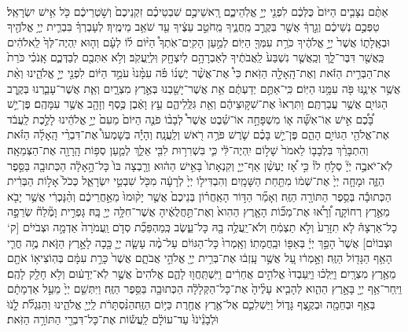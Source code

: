 \documentclass[twoside, openany, parskip=half, 11pt]{book}
\begin{document}
\begin{footnotesize}
\begin{multicols}{2}
\\
 אַתֶּ֨ם נִצָּבִ֤ים הַיּוֹם֙ כֻּלְּכֶ֔ם לִפְנֵ֖י יְיָ֣ אֱלֹֽהֵיכֶ֑ם רָֽאשֵׁיכֶ֣ם שִׁבְטֵיכֶ֗ם זִקְנֵיכֶם֙ וְשֹׁ֣טְרֵיכֶ֔ם כֹּ֖ל אִ֥ישׁ יִשְׂרָאֵֽל׃ טַפְּכֶ֣ם נְשֵׁיכֶ֔ם וְגֵ֣רְךָ֔ אֲשֶׁ֖ר בְּקֶרֶ֣ב מַֽחֲנֶ֑יךָ מֵֽחֹטֵ֣ב עֵצֶ֔יךָ עַ֖ד שֹׁאֵ֥ב מֵימֶֽיךָ׃ לְעָבְרְךָ֗ בִּבְרִ֛ית יְיָ֥ אֱלֹהֶ֖יךָ וּבְאָֽלָת֑וֹ אֲשֶׁר֙ יְיָ֣ אֱלֹהֶ֔יךָ כֹּרֵ֥ת עִמְּךָ֖ הַיּֽוֹם׃ 
 לְמַ֣עַן הָקִֽים־אֹֽתְךָ֩ הַיּ֨וֹם ל֜וֹ לְעָ֗ם וְה֤וּא יִֽהְיֶה־לְּךָ֙ לֵֽאלֹהִ֔ים כַּֽאֲשֶׁ֖ר דִּבֶּר־לָ֑ךְ וְכַֽאֲשֶׁ֤ר נִשְׁבַּע֙ לַֽאֲבֹתֶ֔יךָ לְאַבְרָהָ֥ם לְיִצְחָ֖ק וּֽלְיַֽעֲקֹֽב׃ וְלֹ֥א אִתְּכֶ֖ם לְבַדְּכֶ֑ם אָֽנֹכִ֗י כֹּרֵת֙ אֶת־הַבְּרִ֣ית הַזֹּ֔את וְאֶת־הָֽאָלָ֖ה הַזֹּֽאת׃ כִּי֩ אֶת־אֲשֶׁ֨ר יֶשְׁנ֜וֹ פֹּ֗ה עִמָּ֨נוּ֙ עֹמֵ֣ד הַיּ֔וֹם לִפְנֵ֖י יְיָ֣ אֱלֹהֵ֑ינוּ וְאֵ֨ת אֲשֶׁ֥ר אֵינֶ֛נּוּ פֹּ֖ה עִמָּ֥נוּ הַיּֽוֹם׃ 
 כִּֽי־אַתֶּ֣ם יְדַעְתֶּ֔ם אֵ֥ת אֲשֶׁר־יָשַׁ֖בְנוּ בְּאֶ֣רֶץ מִצְרָ֑יִם וְאֵ֧ת אֲשֶׁר־עָבַ֛רְנוּ בְּקֶ֥רֶב הַגּוֹיִ֖ם אֲשֶׁ֥ר עֲבַרְתֶּֽם׃ וַתִּרְאוּ֙ אֶת־שִׁקּ֣וּצֵיהֶ֔ם וְאֵ֖ת גִּלֻּֽלֵיהֶ֑ם עֵ֣ץ וָאֶ֔בֶן כֶּ֥סֶף וְזָהָ֖ב אֲשֶׁ֥ר עִמָּהֶֽם׃ פֶּן־יֵ֣שׁ בָּ֠כֶ֠ם אִ֣ישׁ אֽוֹ־אִשָּׁ֞ה א֧וֹ מִשְׁפָּחָ֣ה אוֹ־שֵׁ֗בֶט אֲשֶׁר֩ לְבָב֨וֹ פֹנֶ֤ה הַיּוֹם֙ מֵעִם֙ יְיָ֣ אֱלֹהֵ֔ינוּ לָלֶ֣כֶת לַֽעֲבֹ֔ד אֶת־אֱלֹהֵ֖י הַגּוֹיִ֣ם הָהֵ֑ם פֶּן־יֵ֣שׁ בָּכֶ֗ם שֹׁ֛רֶשׁ פֹּרֶ֥ה רֹ֖אשׁ וְלַֽעֲנָֽה׃ וְהָיָ֡ה בְּשָׁמְעוֹ֩ אֶת־דִּבְרֵ֨י הָֽאָלָ֜ה הַזֹּ֗את וְהִתְבָּרֵ֨ךְ בִּלְבָב֤וֹ לֵאמֹר֙ שָׁל֣וֹם יִֽהְיֶה־לִּ֔י כִּ֛י בִּשְׁרִר֥וּת לִבִּ֖י אֵלֵ֑ךְ לְמַ֛עַן סְפ֥וֹת הָֽרָוָ֖ה אֶת־הַצְּמֵאָֽה׃ לֹֽא־יֹאבֶ֣ה יְיָ֘ סְלֹ֣חַ לוֹ֒ כִּ֣י אָ֠ז יֶעְשַׁ֨ן אַף־יְיָ֤ וְקִנְאָתוֹ֙ בָּאִ֣ישׁ הַה֔וּא וְרָ֤בְצָה בּוֹ֙ כָּל־הָ֣אָלָ֔ה הַכְּתוּבָ֖ה בַּסֵּ֣פֶר הַזֶּ֑ה וּמָחָ֤ה יְיָ֙ אֶת־שְׁמ֔וֹ מִתַּ֖חַת הַשָּׁמָֽיִם׃ וְהִבְדִּיל֤וֹ יְיָ֙ לְרָעָ֔ה מִכֹּ֖ל שִׁבְטֵ֣י יִשְׂרָאֵ֑ל כְּכֹל֙ אָל֣וֹת הַבְּרִ֔ית הַכְּתוּבָ֕ה בְּסֵ֥פֶר הַתּוֹרָ֖ה הַזֶּֽה׃ וְאָמַ֞ר הַדּ֣וֹר הָאַֽחֲר֗וֹן בְּנֵיכֶם֙ אֲשֶׁ֤ר יָק֨וּמוּ֙ מֵאַ֣חֲרֵיכֶ֔ם וְהַ֨נָּכְרִ֔י אֲשֶׁ֥ר יָבֹ֖א מֵאֶ֣רֶץ רְחוֹקָ֑ה וְ֠רָא֠וּ אֶת־מַכּ֞וֹת הָאָ֤רֶץ הַהִוא֙ וְאֶת־תַּ֣חֲלֻאֶ֔יהָ אֲשֶׁר־חִלָּ֥ה יְיָ֖ בָּֽהּ׃ גָּפְרִ֣ית וָמֶ֘לַח֘ שְׂרֵפָ֣ה כָל־אַרְצָהּ֒ לֹ֤א תִזָּרַע֙ וְלֹ֣א תַצְמִ֔חַ וְלֹא־יַֽעֲלֶ֥ה בָ֖הּ כָּל־עֵ֑שֶׂב כְּֽמַהְפֵּכַ֞ת סְדֹ֤ם וַֽעֲמֹרָה֙ אַדְמָ֣ה וּצְבֹיִי֔ם [ק‘ וּצְבוֹיִ֔ם] אֲשֶׁר֙ הָפַ֣ךְ יְיָ֔ בְּאַפּ֖וֹ וּבַֽחֲמָתֽוֹ׃ וְאָֽמְרוּ֙ כָּל־הַגּוֹיִ֔ם עַל־מֶ֨ה עָשָׂ֧ה יְיָ֛ כָּ֖כָה לָאָ֣רֶץ הַזֹּ֑את מֶ֥ה חֳרִ֛י הָאַ֥ף הַגָּד֖וֹל הַזֶּֽה׃ וְאָ֣מְר֔וּ עַ֚ל אֲשֶׁ֣ר עָֽזְב֔וּ אֶת־בְּרִ֥ית יְיָ֖ אֱלֹהֵ֣י אֲבֹתָ֑ם אֲשֶׁר֙ כָּרַ֣ת עִמָּ֔ם בְּהֽוֹצִיא֥וֹ אֹתָ֖ם מֵאֶ֥רֶץ מִצְרָֽיִם׃ וַיֵּֽלְכ֗וּ וַיַּֽעַבְדוּ֙ אֱלֹהִ֣ים אֲחֵרִ֔ים וַיִּֽשְׁתַּֽחֲו֖וּ לָהֶ֑ם אֱלֹהִים֙ אֲשֶׁ֣ר לֹֽא־יְדָע֔וּם וְלֹ֥א חָלַ֖ק לָהֶֽם׃ וַיִּֽחַר־אַ֥ף יְיָ֖ בָּאָ֣רֶץ הַהִ֑וא לְהָבִ֤יא עָלֶ֨יהָ֙ אֶת־כָּל־הַקְּלָלָ֔ה הַכְּתוּבָ֖ה בַּסֵּ֥פֶר הַזֶּֽה׃ וַיִּתְּשֵׁ֤ם יְיָ֙ מֵעַ֣ל אַדְמָתָ֔ם בְּאַ֥ף וּבְחֵמָ֖ה וּבְקֶ֣צֶף גָּד֑וֹל וַיַּשְׁלִכֵ֛ם אֶל־אֶ֥רֶץ אֲחֶ֖רֶת כַּיּ֥וֹם הַזֶּֽה׃הַנִּ֨סְתָּרֹ֔ת לַֽיְיָ֖ אֱלֹהֵ֑ינוּ וְהַנִּגְלֹ֞ת לָֹ֤נֹוֹּ וֹּלְֹבָֹנֵֹ֨יֹנֹוֹּ֙ עַד־עוֹלָ֔ם לַֽעֲשׂ֕וֹת אֶת־כָּל־דִּבְרֵ֖י הַתּוֹרָ֥ה הַזֹּֽאת׃


\end{multicols}
\end{footnotesize}
\end{document}
